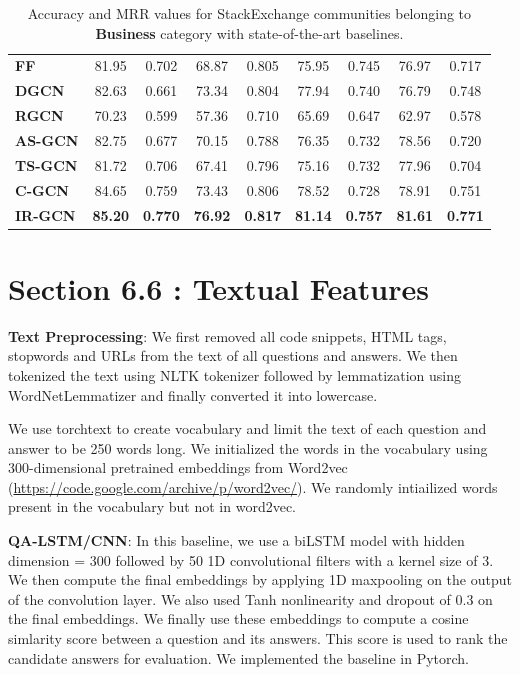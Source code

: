 \documentclass[smallcondensed]{svjour3}     %
\begin{document}
\begin{table}[h]
\begin{tabular}{l|c c|c c|c c|c c}
\textbf{FF~\cite{JendersKN16}}&81.95&0.702&68.87&0.805&75.95&0.745&76.97&0.717\\

\textbf{DGCN~\cite{DualGCN}}&82.63&0.661&73.34&0.804&77.94&0.740&76.79&0.748\\

\textbf{RGCN~\cite{relationalGCN}}&70.23&0.599&57.36&0.710&65.69&0.647&62.97&0.578\\

        \cmidrule(lr){1-1}\cmidrule(lr){2-9}%
        \textbf{AS-GCN}&82.75&0.677&70.15&0.788&76.35&0.732&78.56&0.720\\

\textbf{TS-GCN}&81.72&0.706&67.41&0.796&75.16&0.732&77.96&0.704\\

\textbf{C-GCN}&84.65&0.759&73.43&0.806&78.52&0.728&78.91&0.751\\

\textbf{IR-GCN}&\textbf{85.20}&\textbf{0.770}&\textbf{76.92}&\textbf{0.817}&\textbf{81.14}&\textbf{0.757}&\textbf{81.61}&\textbf{0.771}\\
      \bottomrule
    \end{tabular}
  \caption{\label{tab:stackacc5} Accuracy and MRR values for StackExchange communities belonging to \textbf{Business} category with state-of-the-art baselines.}
\end{table}

\section{Section 6.6 : Textual Features}
\textbf{Text Preprocessing}: We first removed all code snippets, HTML tags, stopwords and URLs from the text of all questions and answers. We then tokenized the text using NLTK tokenizer followed by lemmatization using WordNetLemmatizer and finally converted it into lowercase.

We use torchtext to create vocabulary and limit the text of each question and answer to be 250 words long. We initialized the words in the vocabulary using 300-dimensional pretrained embeddings from Word2vec (\url{https://code.google.com/archive/p/word2vec/}). We randomly intiailized words present in the vocabulary but not in word2vec.

\textbf{QA-LSTM/CNN}: In this baseline, we use a biLSTM model with hidden dimension = 300 followed by 50 1D convolutional filters with a kernel size of 3. We then compute the final embeddings by applying 1D maxpooling on the output of the convolution layer. We also used Tanh nonlinearity and dropout of 0.3 on the final embeddings. We finally use these embeddings to compute a cosine simlarity score between a question and its answers. This score is used to rank the candidate answers for evaluation. We implemented the baseline in Pytorch.
\end{document}

